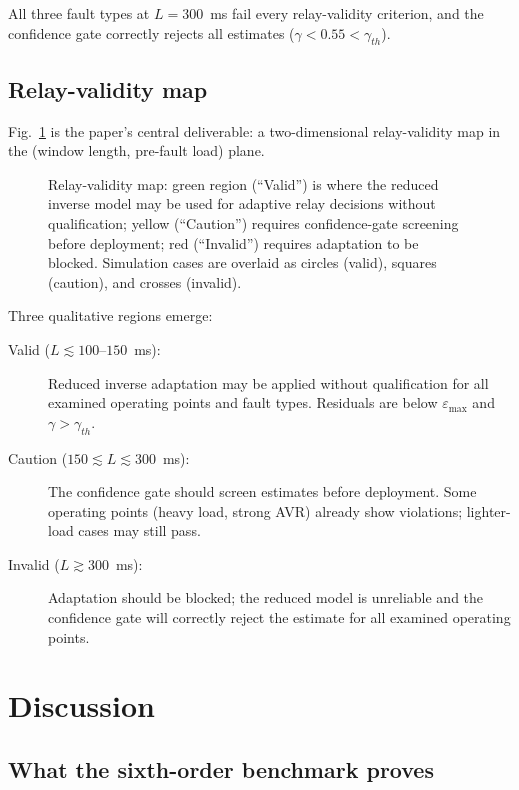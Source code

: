 \documentclass[journal,twoside,letterpaper]{IEEEtran}
\begin{document}
All three fault types at $L = 300$~ms fail every relay-validity
criterion, and the confidence gate correctly rejects all
estimates ($\gamma < 0.55 < \gamma_{th}$).

\subsection{Relay-validity map}

Fig.~\ref{fig:validity_map} is the paper's central
deliverable: a two-dimensional relay-validity map in the
(window length, pre-fault load) plane.

\begin{figure}[!t]
  \centering
  
  \caption{Relay-validity map: green region (``Valid'') is
    where the reduced inverse model may be used for
    adaptive relay decisions without qualification; yellow
    (``Caution'') requires confidence-gate screening before
    deployment; red (``Invalid'') requires adaptation to be
    blocked.
    Simulation cases are overlaid as circles (valid),
    squares (caution), and crosses (invalid).}
  \label{fig:validity_map}
\end{figure}

Three qualitative regions emerge:
\begin{description}
  \item[Valid ($L \lesssim 100$--$150$~ms):] Reduced inverse
    adaptation may be applied without qualification for all
    examined operating points and fault types.
    Residuals are below $\varepsilon_{\max}$ and $\gamma >
    \gamma_{th}$.
  \item[Caution ($150 \lesssim L \lesssim 300$~ms):] The
    confidence gate should screen estimates before deployment.
    Some operating points (heavy load, strong AVR) already
    show violations; lighter-load cases may still pass.
  \item[Invalid ($L \gtrsim 300$~ms):] Adaptation should be
    blocked; the reduced model is unreliable and the
    confidence gate will correctly reject the estimate
    for all examined operating points.
\end{description}

\section{Discussion}
\label{sec:discussion}

\subsection{What the sixth-order benchmark proves}
\end{document}
